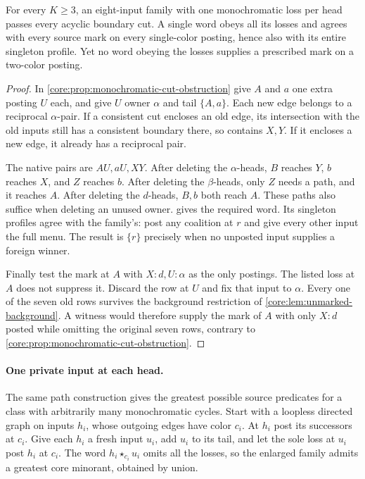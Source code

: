 \begin{proposition}
\label{core:prop:pure-posting-obstruction}
For every $K\ge3$, an eight-input family with one monochromatic loss
per head passes every acyclic boundary cut. A single word obeys all
its losses and agrees with every source mark on every single-color
posting, hence also with its entire singleton profile. Yet no word
obeying the losses supplies a prescribed mark on a two-color posting.
\end{proposition}
\begin{proof}
In \cref{core:prop:monochromatic-cut-obstruction} give $A$ and $a$
one extra posting $U$ each, and give $U$ owner $\alpha$ and tail
$\{A,a\}$. Each new edge belongs to a reciprocal $\alpha$-pair.
If a consistent cut encloses an old edge, its intersection with
the old inputs still has a consistent boundary there, so contains
$X,Y$. If it encloses a new edge, it already has a reciprocal pair.

The native pairs are $AU,aU,XY$. After deleting the $\alpha$-heads,
$B$ reaches $Y$, $b$ reaches $X$, and $Z$ reaches $b$. After deleting
the $\beta$-heads, only $Z$ needs a path, and it reaches $A$. After
deleting the $d$-heads, $B,b$ both reach $A$. These paths also
suffice when deleting an unused owner.
 gives the required word.
Its singleton profiles agree with the family's: post any coalition
at $r$ and give every other input the full menu. The result is
$\{r\}$ precisely when no unposted input supplies a foreign winner.

Finally test the mark at $A$ with $X{:}d,U{:}\alpha$ as the only
postings. The listed loss at $A$ does not suppress it. Discard the
row at $U$ and fix that input to $\alpha$. Every one of the seven
old rows survives the background restriction of
\cref{core:lem:unmarked-background}. A witness would therefore
supply the mark of $A$ with only $X{:}d$ posted while omitting the
original seven rows, contrary to \cref{core:prop:monochromatic-cut-obstruction}.
\end{proof}

\paragraph{One private input at each head.}
The same path construction gives the greatest possible source predicates
for a class with arbitrarily many monochromatic cycles.
Start with a loopless directed graph on inputs $h_i$, whose outgoing
edges have color $c_i$. At $h_i$ post its successors at $c_i$.
Give each $h_i$ a fresh input $u_i$, add $u_i$ to its tail, and let the
sole loss at $u_i$ post $h_i$ at $c_i$. The word $h_i\star_{c_i}u_i$
omits all the losses, so the enlarged family admits a greatest core
minorant, obtained by union.

